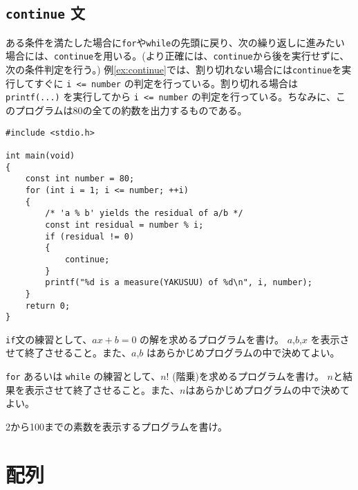 \subsection{\texttt{continue} 文}
ある条件を満たした場合に\texttt{for}や\texttt{while}の先頭に戻り、次の繰り返しに進みたい場合には、\texttt{continue}を用いる。(より正確には、\texttt{continue}から後を実行せずに、次の条件判定を行う。) 例\ref{ex:continue}では、割り切れない場合には\texttt{continue}を実行してすぐに \texttt{i <= number} の判定を行っている。割り切れる場合は \texttt{printf(...)} を実行してから \texttt{i <= number} の判定を行っている。ちなみに、このプログラムは80の全ての約数を出力するものである。
\begin{reidai}\label{ex:continue}
    \begin{verbatim}
#include <stdio.h>

int main(void)
{
    const int number = 80;
    for (int i = 1; i <= number; ++i)
    {
        /* 'a % b' yields the residual of a/b */
        const int residual = number % i;
        if (residual != 0)
        {
            continue;
        }
        printf("%d is a measure(YAKUSUU) of %d\n", i, number);
    }
    return 0;
}
\end{verbatim}
\end{reidai}
\begin{renshuu}\label{prob:2-1}
    \texttt{if}文の練習として、\(ax+b=0\) の解を求めるプログラムを書け。
    \(a\),\(b\),\(x\) を表示させて終了させること。また、\(a\),\(b\) はあらかじめプログラムの中で決めてよい。
\end{renshuu}

\begin{renshuu}\label{prob:2-2}
    \texttt{for} あるいは \texttt{while} の練習として、\(n!\) (階乗)を求めるプログラムを書け。
    \(n\)と結果を表示させて終了させること。また、\(n\)はあらかじめプログラムの中で決めてよい。
\end{renshuu}

\begin{renshuu}\label{prob:2-3}
    2から100までの素数を表示するプログラムを書け。
\end{renshuu}

\section{配列}

